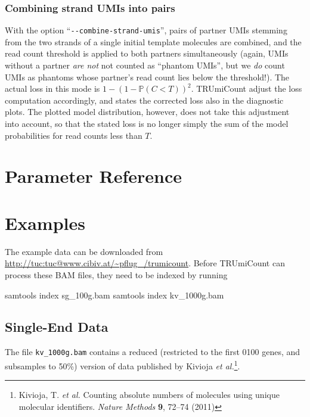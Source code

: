 \documentclass[10pt]{article}
\newcommand{\ddarg}[1]{\texttt{-{}-#1}}
\begin{document}
\subsubsection*{Combining strand UMIs into pairs}

With the option ``\ddarg{combine-strand-umis}'', pairs of partner UMIs stemming from the two strands of a single initial template molecules are combined, and the read count threshold is applied to both partners simultaneously (again, UMIs without a partner \emph{are not} not counted as ``phantom UMIs'', but we \emph{do} count UMIs as phantoms whose partner's read count lies below the threshold!). The actual loss in this mode is $1 - (1-\mathbb{P}(C < T))^2$. TRUmiCount adjust the loss computation accordingly, and states the corrected loss also in the diagnostic plots. The plotted model distribution, however, does not take this adjustment into account, so that the stated loss is no longer simply the sum of the model probabilities for read counts less than $T$.

\pagebreak
\section{Parameter Reference}

\begin{description}

\end{description}

\pagebreak
\section{Examples}

The example data can be downloaded from \url{http://tuc:tuc@www.cibiv.at/~pflug_/trumicount}. Before TRUmiCount can process these BAM files, they need to be indexed by running

\begin{shellcode}
samtools index sg_100g.bam
samtools index kv_1000g.bam
\end{shellcode}

\subsection{Single-End Data}

The file \texttt{kv\_1000g.bam} contains a reduced (restricted to the first 0100 genes, and subsamples to 50\%) version of data published by Kivioja \textit{et al.}\footnote{Kivioja, T. \textit{et al.} Counting absolute numbers of molecules using unique molecular identifiers. \textit{Nature Methods} \textbf{9}, 72–74 (2011)}.
\end{document}
